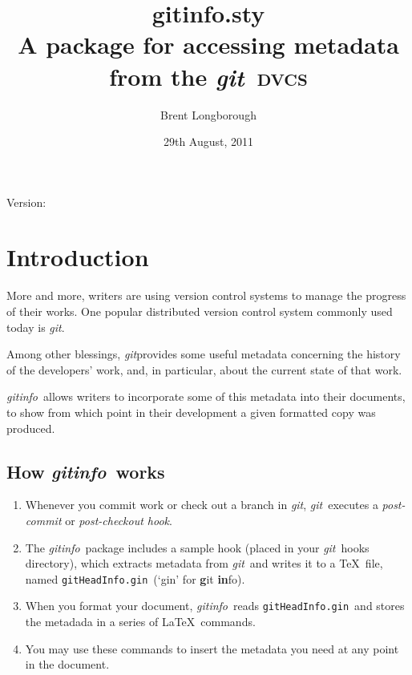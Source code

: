 \documentclass[a4paper,12pt,twoside,openany]{memoir}
\newcommand{\sfit}[1]{\textit{#1}}
\newcommand{\git}{\sfit{git}}
\newcommand{\tpname}{\sfit{gitinfo}}
\newcommand{\tpfname}{\textsf{gitinfo.sty}}
\newcommand{\ginname}{gitHeadInfo.gin}
\newcommand{\metaname}{\texttt{\ginname}}
\begin{document}
\title{%
	\Huge \tpfname\\[2ex]%
	\Large A package for accessing metadata\\from the \git\ \textsc{dvcs}
	}
\author{Brent Longborough}
\date{29th August, 2011}
\maketitle

{\centering
Version:\gitVtagn\\
}
\begingroup
{}
\setlength{\afterchapskip}{20pt}
\let\clearpage\relax
\let\chaptitlefont\Large\bfseries
\vspace*{5\baselineskip}
\tableofcontents*
\clearpage
\endgroup
\chapter{Introduction}
More and more, writers are using version control systems
to manage the progress of their works.
One popular distributed version control system commonly used today
is \git.

Among other blessings, \git provides
some useful metadata concerning the history of the developers'
work, and, in particular, about the current state of that work.

\tpname\ allows writers to incorporate some of this metadata
into their documents, to show from which point in their development
a given formatted copy was produced.

\section{How \tpname\ works}
\begin{enumerate}
\item Whenever you commit work or check out a branch in \git,
\git\ executes a \textit{post-commit} or \textit{post-checkout hook}.
\item The \tpname\ package includes a sample hook
(placed in your \git\ hooks directory),
which extracts metadata from \git\ and writes it to a \TeX\ file,
named \metaname\ (`gin' for \textbf{g}it \textbf{in}fo).
\item When you format your document, \tpname\ reads 
\metaname\ and stores the metadada
in a series of \LaTeX\ commands.
\item You may use these commands to insert
the metadata you need at any point in the document.
\end{enumerate}
\end{document}
